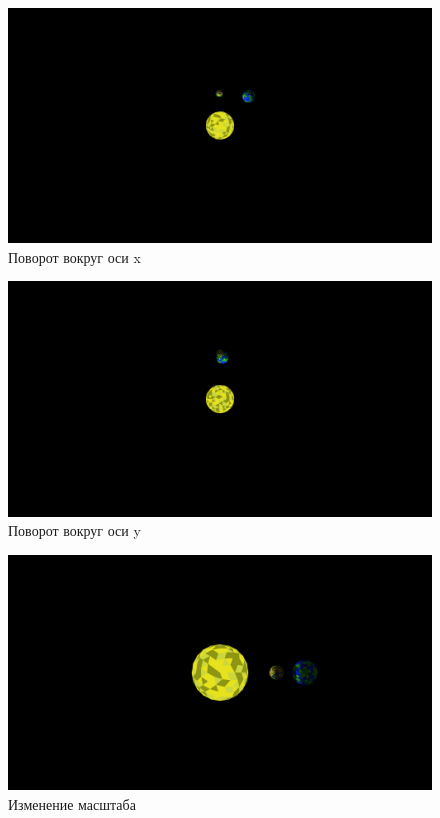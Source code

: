\begin{center}
	\begin{figure}[H]
		\centering
		\includegraphics[scale=0.3]{inc/img/xrotation.png}
		\caption{Поворот вокруг оси x}
		\label{img:test_xrotation}
	\end{figure}
\end{center}

\begin{center}
	\begin{figure}[H]
		\centering
		\includegraphics[scale=0.3]{inc/img/yrotation.png}
		\caption{Поворот вокруг оси y}
		\label{img:test_yrotation}
	\end{figure}
\end{center}

\begin{center}
	\begin{figure}[H]
		\centering
		\includegraphics[scale=0.3]{inc/img/scaling.png}
		\caption{Изменение масштаба}
		\label{img:test_scaling}
	\end{figure}
\end{center}

